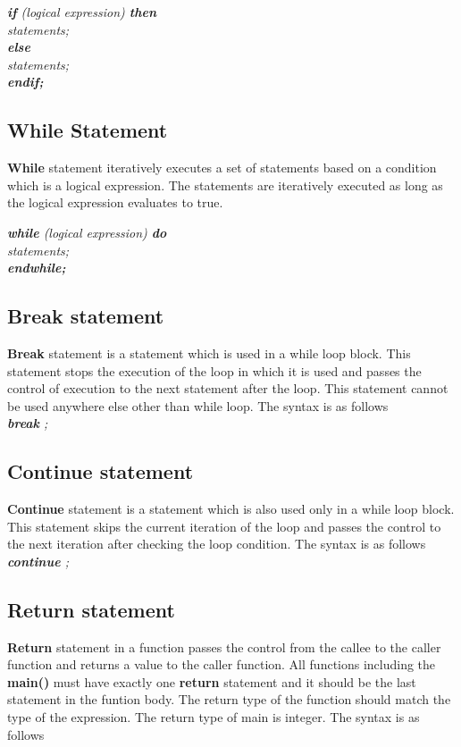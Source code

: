\textit{
\textbf{if} (logical expression) \textbf{then}  \\
 \indent \indent statements; \\
\indent \textbf{else} \\
\indent  \indent statements; \\
\indent \textbf{endif;}  \\
}



\subsection{While Statement}
\textbf{While} statement iteratively executes a set of statements based on a condition which is a logical expression.  The statements are iteratively executed as long as the logical expression evaluates to true.

\textit{
\textbf{while} (logical expression) \textbf{do}  \\
 \indent \indent statements; \\
\indent \textbf{endwhile;}  \\
}

\subsection{Break statement}
\textbf{Break} statement is a statement which is used in a while loop block. This statement stops the execution of the loop in which it is used and passes the control of execution to the next statement after the loop. This statement cannot be used anywhere else other than while loop. The syntax is as follows\\

\textit{\textbf{break} ;}

\subsection{Continue statement}
\textbf{Continue} statement is a statement which is also used only in a while loop block. This statement skips the current iteration of the loop and passes the control to the next iteration after checking the loop condition. The syntax is as follows\\

\textit{\textbf{continue} ;}



\subsection{Return statement}
\textbf{Return} statement in a function passes the control from the callee to the caller function and returns a value to the caller function. All functions including the \textbf{main()} must have exactly one \textbf{return} statement and it should be the last statement in the funtion body. The return type of the function should match the type of the expression. The return type of main is integer. The syntax is as follows\\

